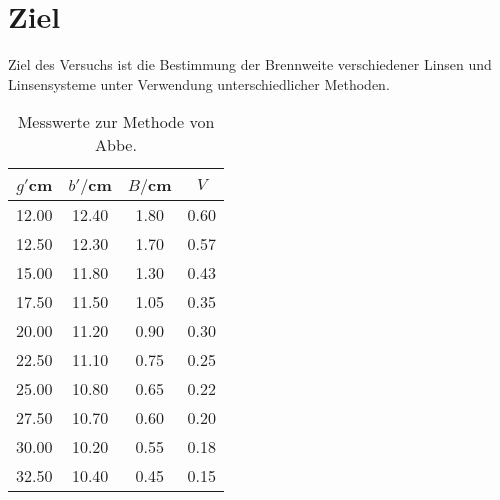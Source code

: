 \section{Ziel}
\label{sec:Ziel}
Ziel des Versuchs ist die Bestimmung der Brennweite verschiedener Linsen und Linsensysteme
unter Verwendung unterschiedlicher Methoden.


\begin{table}[htp]
	\begin{center}
    \caption{Messwerte zur Methode von Abbe.}
    \label{tab:abbe}
		\begin{tabular}{cccc}
		\toprule
			{$g'$cm} & {$b'/$cm} & {$B/$cm} & {$V$}\\
			\midrule
			12.00 & 12.40 & 1.80 & 0.60\\
			12.50 & 12.30 & 1.70 & 0.57\\
			15.00 & 11.80 & 1.30 & 0.43\\
			17.50 & 11.50 & 1.05 & 0.35\\
			20.00 & 11.20 & 0.90 & 0.30\\
			22.50 & 11.10 & 0.75 & 0.25\\
			25.00 & 10.80 & 0.65 & 0.22\\
			27.50 & 10.70 & 0.60 & 0.20\\
			30.00 & 10.20 & 0.55 & 0.18\\
			32.50 & 10.40 & 0.45 & 0.15\\
		\bottomrule
		\end{tabular}
	\end{center}
\end{table}
